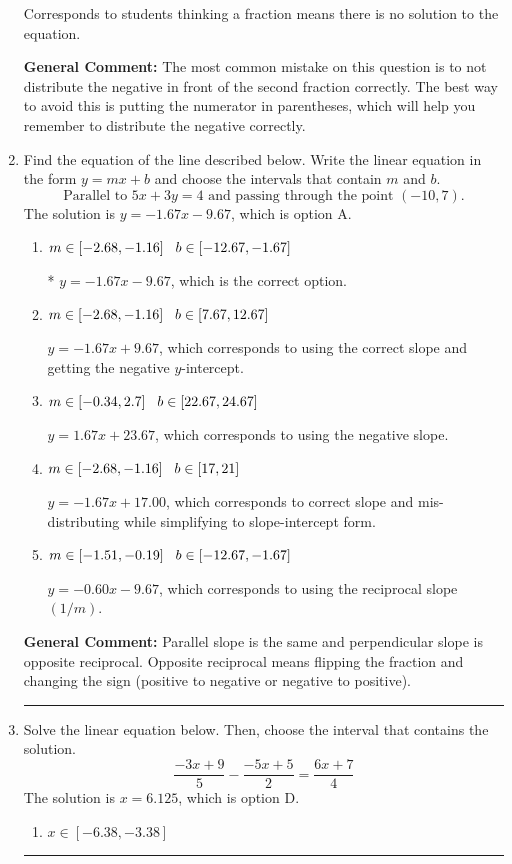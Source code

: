 \documentclass{extbook}[14pt]
\newcommand{\litem}[1]{\item #1

\rule{\textwidth}{0.4pt}}
\begin{document}
\begin{enumerate}
{\begin{enumerate}[label=\Alph*.]
Corresponds to students thinking a fraction means there is no solution to the equation.
\end{enumerate}

\textbf{General Comment:} The most common mistake on this question is to not distribute the negative in front of the second fraction correctly. The best way to avoid this is putting the numerator in parentheses, which will help you remember to distribute the negative correctly.
}
\litem{
Find the equation of the line described below. Write the linear equation in the form $ y=mx+b $ and choose the intervals that contain $m$ and $b$.
\[ \text{Parallel to } 5 x + 3 y = 4 \text{ and passing through the point } (-10, 7). \]The solution is \( y = -1.67x - 9.67 \), which is option A.\begin{enumerate}[label=\Alph*.]
\item \( m \in [-2.68, -1.16] \hspace*{3mm} b \in [-12.67, -1.67] \)

* $y = -1.67x - 9.67$, which is the correct option.
\item \( m \in [-2.68, -1.16] \hspace*{3mm} b \in [7.67, 12.67] \)

 $y = -1.67x + 9.67$, which corresponds to using the correct slope and getting the negative $y$-intercept.
\item \( m \in [-0.34, 2.7] \hspace*{3mm} b \in [22.67, 24.67] \)

 $y = 1.67x + 23.67$, which corresponds to using the negative slope.
\item \( m \in [-2.68, -1.16] \hspace*{3mm} b \in [17, 21] \)

 $y = -1.67x + 17.00$, which corresponds to correct slope and mis-distributing while simplifying to slope-intercept form.
\item \( m \in [-1.51, -0.19] \hspace*{3mm} b \in [-12.67, -1.67] \)

 $y = -0.60x - 9.67$, which corresponds to using the reciprocal slope $(1/m)$.
\end{enumerate}

\textbf{General Comment:} Parallel slope is the same and perpendicular slope is opposite reciprocal. Opposite reciprocal means flipping the fraction and changing the sign (positive to negative or negative to positive).
}
\litem{
Solve the linear equation below. Then, choose the interval that contains the solution.
\[ \frac{-3x + 9}{5} - \frac{-5x + 5}{2} = \frac{6x + 7}{4} \]The solution is \( x = 6.125 \), which is option D.\begin{enumerate}[label=\Alph*.]
\item \( x \in [-6.38, -3.38] \)


\end{enumerate}}
\end{enumerate}
\end{document}
